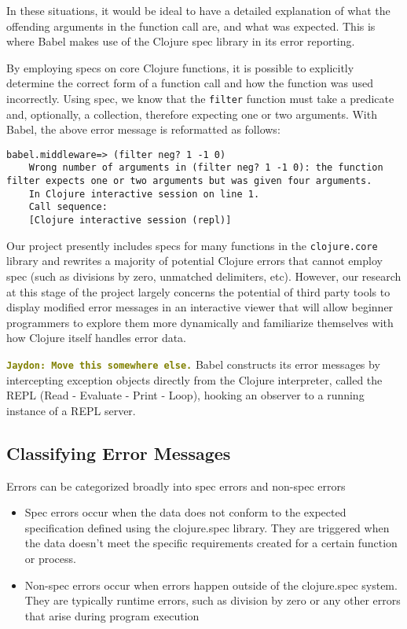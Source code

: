 \documentclass[12pt]{article}
\newcommand{\comment}[1]{{\bf \tt  {#1}}}
\newcommand{\jscomment}[1]{\textcolor{olive}{\comment{Jaydon: {#1}}}}
\begin{document}
In these situations, it would be ideal to have a detailed explanation of what the offending arguments in the function call are, and what was expected. This is where Babel makes use of the Clojure spec library in its error reporting.

By employing specs on core Clojure functions, it is possible to explicitly determine the correct form of a function call and how the function was used incorrectly. Using spec, we know that the \verb|filter| function must take a predicate and, optionally, a collection, therefore expecting one or two arguments. With Babel, the above error message is reformatted as follows:

\begin{lstlisting}[breaklines=true, basicstyle=\ttfamily]
    babel.middleware=> (filter neg? 1 -1 0)
    Wrong number of arguments in (filter neg? 1 -1 0): the function filter expects one or two arguments but was given four arguments.
    In Clojure interactive session on line 1.
    Call sequence:
    [Clojure interactive session (repl)]
\end{lstlisting}

Our project presently includes specs for many functions in the \verb|clojure.core| library and rewrites a majority of potential Clojure errors that cannot employ spec (such as divisions by zero, unmatched delimiters, etc). However, our research at this stage of the project largely concerns the potential of third party tools to display modified error messages in an interactive viewer that will allow beginner programmers to explore them more dynamically and familiarize themselves with how Clojure itself handles error data.

\jscomment{Move this somewhere else.}
Babel constructs its error messages by intercepting exception objects directly from the Clojure interpreter, called the REPL (Read - Evaluate - Print - Loop), hooking an observer to a running instance of a REPL server.

\subsection{Classifying Error Messages}\label{subsec:classification}

Errors can be categorized broadly into spec errors and non-spec errors
\begin{itemize}

	\item Spec errors occur when the data does not conform to the expected specification defined using the clojure.spec library. They are triggered when the data doesn't meet the specific requirements created for a certain function or process.
	
	\item Non-spec errors occur when errors happen outside of the clojure.spec system. They are typically runtime errors, such as division by zero or any other errors that arise during program execution

\end{itemize}
\end{document}
